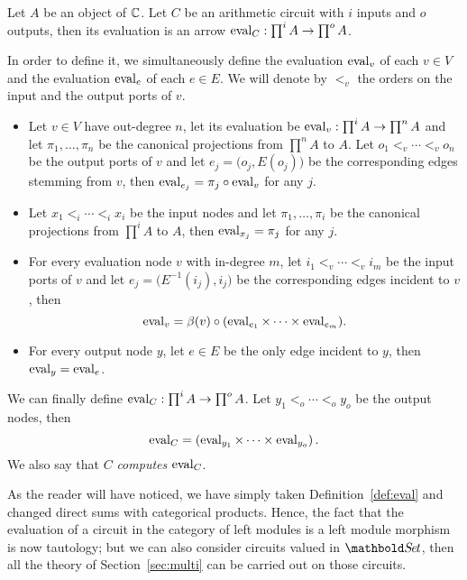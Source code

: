 \begin{definition}
  Let $A$ be an object of $\mathbb{C}$. Let $C$ be an arithmetic circuit with
  $i$ inputs and $o$ outputs, then its evaluation is an arrow
  $\operatorname{eval}_C:\prod^iA\rightarrow\prod^oA$.
  
  In order to define it, we simultaneously define the evaluation
  $\operatorname{eval}_v$ of each $v\in V$ and the evaluation $\operatorname{eval}_e$ of each
  $e\in E$. We will denote by $<_v$ the orders on the input and the
  output ports of $v$.
  \begin{itemize}
  \item Let $v\in V$ have out-degree $n$, let its evaluation be
    $\operatorname{eval}_v:\prod^iA\rightarrow\prod^nA$ and let $\pi_1,\ldots,\pi_n$ be the
    canonical projections from $\prod^nA$ to $A$. Let
    $o_1<_v\cdots<_vo_n$ be the output ports of $v$ and let
    $e_j=\bigl(o_j,E(o_j)\bigr)$ be the corresponding edges stemming
    from $v$, then $\operatorname{eval}_{e_j} = \pi_j\circ\operatorname{eval}_v$ for any $j$.
  \item Let $x_1<_i\cdots<_ix_i$ be the input nodes and let
    $\pi_1,\ldots,\pi_i$ be the canonical projections from $\prod^iA$
    to $A$, then $\operatorname{eval}_{x_j}=\pi_j$ for any $j$.
  \item For every evaluation node $v$ with in-degree $m$, let
    $i_1<_v\cdots<_vi_m$ be the input ports of $v$ and let
    $e_j=\bigl(E^{-1}(i_j),i_j\bigr)$ be the corresponding edges
    incident to $v$, then
    \begin{equation}
      \operatorname{eval}_v = \beta(v) \circ (\operatorname{eval}_{e_1}\times\cdots\times\operatorname{eval}_{e_m})
      \text{.}
    \end{equation}
  \item For every output node $y$, let $e\in E$ be the only edge
    incident to $y$, then $\operatorname{eval}_y=\operatorname{eval}_e$.
  \end{itemize}
    
  We can finally define $\operatorname{eval}_C:\prod^iA\rightarrow\prod^oA$. Let
  $y_1<_o\cdots<_oy_o$ be the output nodes, then
  \begin{equation}
    \operatorname{eval}_C = \left(\operatorname{eval}_{y_1}\times\cdots\times\operatorname{eval}_{y_o}\right)
    \text{.}
  \end{equation}
  We also say that $C$ \emph{computes} $\operatorname{eval}_C$.
\end{definition}
  
As the reader will have noticed, we have simply taken
Definition~\ref{def:eval} and changed direct sums with categorical
products. Hence, the fact that the evaluation of a circuit in the
category of left modules is a left module morphism is now tautology;
but we can also consider circuits valued in $\Set$, then all
the theory of Section~\ref{sec:multi} can be carried out on those
circuits.
  


